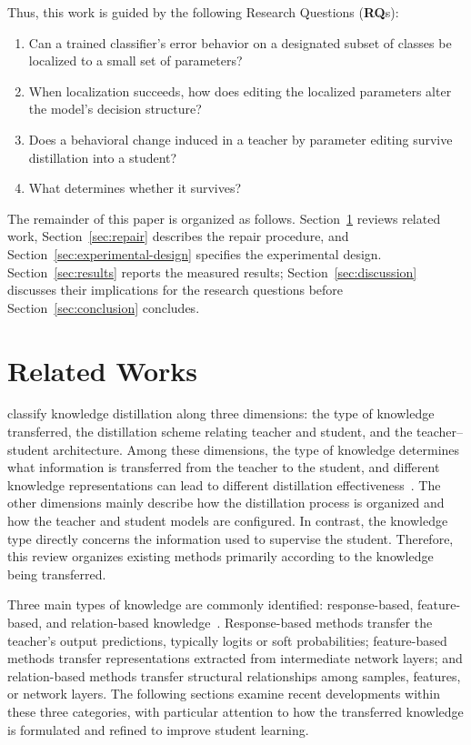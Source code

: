 \documentclass[review,number,sort&compress]{elsarticle}
\theoremstyle{definition}
\begin{document}
Thus, this work is guided by the following Research Questions (\textbf{RQ}s):
\begin{enumerate}
  \renewcommand{\labelenumi}{\textbf{RQ\arabic{enumi}:}}
  \item Can a trained classifier's error behavior on a designated subset of
  classes be localized to a small set of parameters?
  \item When localization succeeds, how does editing the localized parameters
  alter the model's decision structure?
  \item Does a behavioral change induced in a teacher by parameter editing
  survive distillation into a student?
  \item What determines whether it survives?
\end{enumerate}

The remainder of this paper is organized as follows.
Section~\ref{sec:related-work} reviews related work,
Section~\ref{sec:repair} describes the repair procedure, and
Section~\ref{sec:experimental-design} specifies the experimental
design. Section~\ref{sec:results} reports the measured results;
Section~\ref{sec:discussion} discusses their implications for the
research questions before Section~\ref{sec:conclusion} concludes.

\section{Related Works}
\label{sec:related-work}

\citet{gou2021knowledge} classify knowledge distillation along three dimensions: the type of knowledge transferred, the distillation scheme relating teacher and student, and the teacher--student architecture. Among these dimensions, the type of knowledge determines what information is transferred from the teacher to the student, and different knowledge representations can lead to different distillation effectiveness~\citep{gou2021knowledge}. The other dimensions mainly describe how the distillation process is organized and how the teacher and student models are configured. In contrast, the knowledge type directly concerns the information used to supervise the student. Therefore, this review organizes existing methods primarily according to the knowledge being transferred.

Three main types of knowledge are commonly identified: response-based, feature-based, and relation-based knowledge~\citep{gou2021knowledge}. Response-based methods transfer the teacher's output predictions, typically logits or soft probabilities; feature-based methods transfer representations extracted from intermediate network layers; and relation-based methods transfer structural relationships among samples, features, or network layers. The following sections examine recent developments within these three categories, with particular attention to how the transferred knowledge is formulated and refined to improve student learning.
\end{document}
